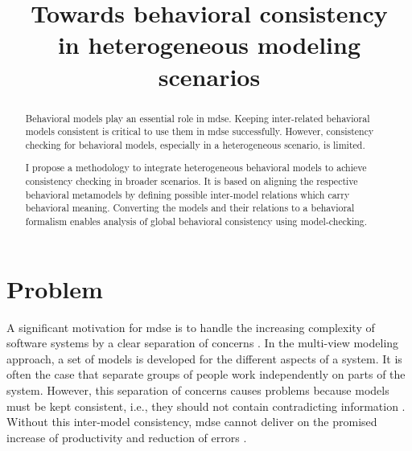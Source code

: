 \documentclass[conference]{IEEEtran}
\begin{document}
\title{Towards behavioral consistency \\ in heterogeneous modeling scenarios}

\author{
}


\maketitle

\begin{abstract}
Behavioral models play an essential role in \gls{mdse}.
Keeping inter-related behavioral models consistent is critical to use them in \gls{mdse} successfully. 
However, consistency checking for behavioral models, especially in a heterogeneous scenario, is limited.

I propose a methodology to integrate heterogeneous behavioral models to achieve consistency checking in broader scenarios.
It is based on aligning the respective behavioral metamodels by defining possible inter-model relations which carry behavioral meaning.
Converting the models and their relations to a behavioral formalism enables analysis of global behavioral consistency using model-checking. 
\end{abstract}


\IEEEpeerreviewmaketitle



\section{Problem}
A significant motivation for \gls{mdse} is to handle the increasing complexity of software systems by a clear separation of concerns \cite{franceModeldrivenDevelopmentComplex2007}.
In the multi-view modeling approach, a set of models is developed for the different aspects of a system.
It is often the case that separate groups of people work independently on parts of the system.
However, this separation of concerns causes problems because models must be kept consistent, i.e., they should not contain contradicting information \cite{cicchettiMultiviewApproachesSoftware2019}.
Without this inter-model consistency, \gls{mdse} cannot deliver on the promised increase of productivity and reduction of errors \cite{brambillaModeldrivenSoftwareEngineering2017}.
\end{document}
